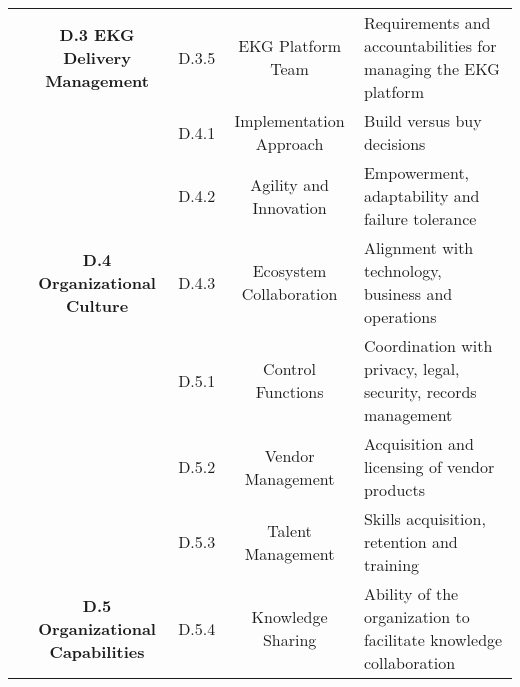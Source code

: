 \begin{table}[ht]
\begin{tabular}{@{}cclcl@{}}
    \cellcolor[HTML]{A5A5A5}{}                                            & \multirow{-5}{*}{\cellcolor[HTML]{BFBFBF}\textbf{D.3 EKG Delivery Management}}     & \cellcolor[HTML]{D8D8D8}D.3.5 & \cellcolor[HTML]{D8D8D8}EKG Platform Team            & \cellcolor[HTML]{F2F2F2}Requirements and accountabilities for managing the EKG platform        \\
    \cellcolor[HTML]{A5A5A5}{}                                            & \cellcolor[HTML]{BFBFBF}                                                           & \cellcolor[HTML]{D8D8D8}D.4.1 & \cellcolor[HTML]{D8D8D8}Implementation Approach      & \cellcolor[HTML]{F2F2F2}Build versus buy decisions                                             \\
    \cellcolor[HTML]{A5A5A5}{}                                            & \cellcolor[HTML]{BFBFBF}                                                           & \cellcolor[HTML]{D8D8D8}D.4.2 & \cellcolor[HTML]{D8D8D8}Agility and Innovation       & \cellcolor[HTML]{F2F2F2}Empowerment, adaptability and failure tolerance                        \\
    \cellcolor[HTML]{A5A5A5}{}                                            & \multirow{-3}{*}{\cellcolor[HTML]{BFBFBF}\textbf{D.4 Organizational Culture}}      & \cellcolor[HTML]{D8D8D8}D.4.3 & \cellcolor[HTML]{D8D8D8}Ecosystem Collaboration      & \cellcolor[HTML]{F2F2F2}Alignment with technology, business and operations                     \\
    \cellcolor[HTML]{A5A5A5}{}                                            & \cellcolor[HTML]{BFBFBF}                                                           & \cellcolor[HTML]{D8D8D8}D.5.1 & \cellcolor[HTML]{D8D8D8}Control Functions            & \cellcolor[HTML]{F2F2F2}Coordination with privacy, legal, security, records management         \\
    \cellcolor[HTML]{A5A5A5}{}                                            & \cellcolor[HTML]{BFBFBF}                                                           & \cellcolor[HTML]{D8D8D8}D.5.2 & \cellcolor[HTML]{D8D8D8}Vendor Management            & \cellcolor[HTML]{F2F2F2}Acquisition and licensing of vendor products                           \\
    \cellcolor[HTML]{A5A5A5}{}                                            & \cellcolor[HTML]{BFBFBF}                                                           & \cellcolor[HTML]{D8D8D8}D.5.3 & \cellcolor[HTML]{D8D8D8}Talent Management            & \cellcolor[HTML]{F2F2F2}Skills acquisition, retention and training                             \\
    \multirow{-23}{*}{\cellcolor[HTML]{A5A5A5}{
        \rotatebox{90}{\textbf{D. ORGANIZATION}}}}                        & \multirow{-4}{*}{\cellcolor[HTML]{BFBFBF}\textbf{D.5 Organizational Capabilities}} & \cellcolor[HTML]{D8D8D8}D.5.4 & \cellcolor[HTML]{D8D8D8}Knowledge Sharing            & \cellcolor[HTML]{F2F2F2}Ability of the organization to facilitate knowledge collaboration     
    \end{tabular}
\end{table}

\egroup
